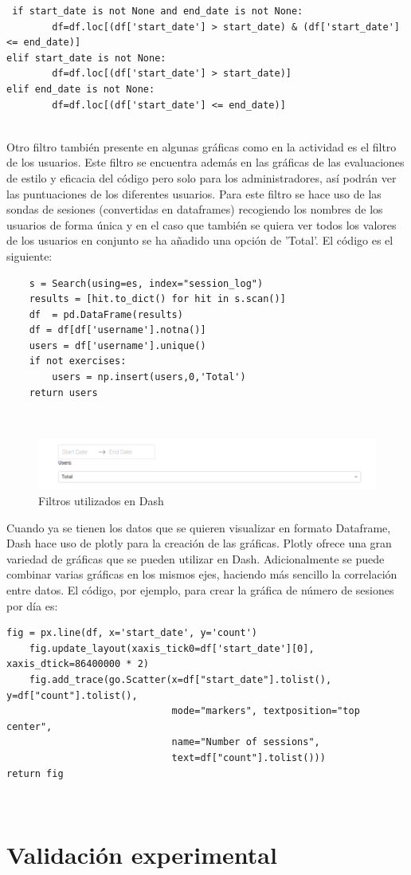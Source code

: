 {\footnotesize
\begin{verbatim}
 if start_date is not None and end_date is not None:
        df=df.loc[(df['start_date'] > start_date) & (df['start_date'] <= end_date)]
elif start_date is not None:
        df=df.loc[(df['start_date'] > start_date)]
elif end_date is not None:
        df=df.loc[(df['start_date'] <= end_date)]
\end{verbatim}
}
\\

Otro filtro también presente en algunas gráficas como en la actividad es el filtro de los usuarios. Este filtro se encuentra además en las gráficas de las evaluaciones de estilo y eficacia del código pero solo para los administradores, así podrán ver las puntuaciones de los diferentes usuarios. Para este filtro se hace uso de las sondas de sesiones (convertidas en dataframes) recogiendo los nombres de los usuarios de forma única y en el caso que también se quiera ver todos los valores de los usuarios en conjunto se ha añadido una opción de 'Total'. El código es el siguiente:

{\footnotesize
\begin{verbatim}
	s = Search(using=es, index="session_log")
    results = [hit.to_dict() for hit in s.scan()]
    df  = pd.DataFrame(results)
    df = df[df['username'].notna()]
    users = df['username'].unique()
    if not exercises:
        users = np.insert(users,0,'Total')
    return users
\end{verbatim}
}
\\
\begin{figure}[H]
    \centering
    \includegraphics[width=16cm, keepaspectratio]{img/filtros.png}
    \caption{Filtros utilizados en Dash}
    \label{fig:filtros}
\end{figure}

Cuando ya se tienen los datos que se quieren visualizar en formato Dataframe, Dash hace uso de plotly para la creación de las gráficas. Plotly ofrece una gran variedad de gráficas que se pueden utilizar en Dash. Adicionalmente se puede combinar varias gráficas en los mismos ejes, haciendo más sencillo la correlación entre datos. El código, por ejemplo, para crear la gráfica de número de sesiones por día es:\\
{\footnotesize
\begin{verbatim}
fig = px.line(df, x='start_date', y='count')
    fig.update_layout(xaxis_tick0=df['start_date'][0], xaxis_dtick=86400000 * 2)
    fig.add_trace(go.Scatter(x=df["start_date"].tolist(), y=df["count"].tolist(),
                             mode="markers", textposition="top center", 
                             name="Number of sessions",
                             text=df["count"].tolist()))
return fig
\end{verbatim}
}
\\
\newpage

\section{Validación experimental}